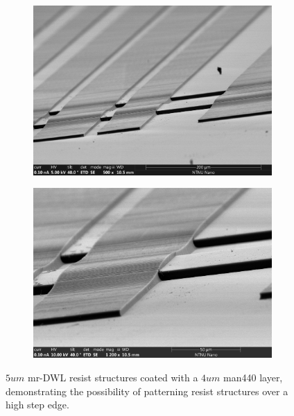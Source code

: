 \begin{figure}
\centering
\begin{subfigure}{.5\textwidth}
  \centering
  \includegraphics[width=\linewidth]{fig/mr-DWL/sem_mr-dwl-2.jpg}
  \label{fig:sfig1}
\end{subfigure}%

\begin{subfigure}{.5\textwidth}
  \centering
  \includegraphics[width=\linewidth]{fig/mr-DWL/sem_mr-dwl.jpg}
  \label{fig:sfig2}
\end{subfigure}
\caption{$5um$ mr-DWL resist structures coated with a $4um$ man440 layer, demonstrating the possibility of patterning resist structures over a high step edge. }
\label{fig:fig}
\end{figure}

